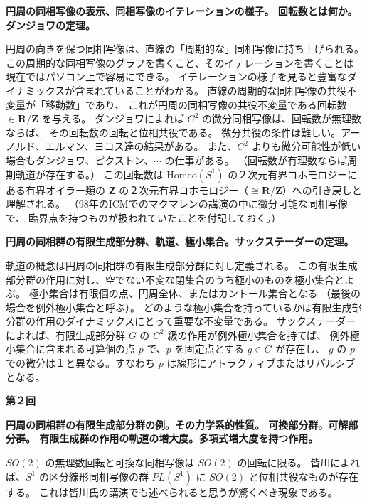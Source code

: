\documentclass[uplatex,dvipdfmx]{jlreq}
\begin{document}
\medskip
\noindent
\textbf{円周の同相写像の表示、同相写像のイテレーションの様子。
回転数とは何か。ダンジョワの定理。}

\medskip

円周の向きを保つ同相写像は、直線の「周期的な」同相写像に持ち上げられる。
この周期的な同相写像のグラフを書くこと、そのイテレーションを書くことは
現在ではパソコン上で容易にできる。
イテレーションの様子を見ると豊富なダイナミックスが含まれていることがわかる。
直線の周期的な同相写像の共役不変量が「移動数」であり、
これが円周の同相写像の共役不変量である回転数 $\in \mathbf{R}/\mathbf{Z}$ を与える。
ダンジョワによれば $C^2$ の微分同相写像は、回転数が無理数ならば、
その回転数の回転と位相共役である。
微分共役の条件は難しい。アーノルド、エルマン、ヨコス達の結果がある。
また、$C^2$ よりも微分可能性が低い場合もダンジョワ、ピクストン、$\cdots$ の仕事がある。
（回転数が有理数ならば周期軌道が存在する。）
この回転数は $\mathrm{Homeo}(S^1)$ の２次元有界コホモロジーにある有界オイラー類の
$\mathbf{Z}$ の２次元有界コホモロジー（$\cong \mathbf{R}/\mathbf{Z}$）への引き戻しと理解される。
（98年のICMでのマクマレンの講演の中に微分可能な同相写像で、
臨界点を持つものが扱われていたことを付記しておく。）

\medskip
\noindent
\textbf{円周の同相群の有限生成部分群、軌道、極小集合。サックステーダーの定理。}

\medskip

軌道の概念は円周の同相群の有限生成部分群に対し定義される。
この有限生成部分群の作用に対し、空でない不変な閉集合のうち極小のものを極小集合とよぶ。
極小集合は有限個の点、円周全体、またはカントール集合となる
（最後の場合を例外極小集合と呼ぶ）。
どのような極小集合を持っているかは有限生成部分群の作用のダイナミックスにとって重要な不変量である。
サックステーダーによれば、有限生成部分群 $G$ の $C^2$ 級の作用が例外極小集合を持てば、
例外極小集合に含まれる可算個の点 $p$ で、$p$ を固定点とする $g \in G$ が存在し、
$g$ の $p$ での微分は１と異なる。すなわち $p$ は線形にアトラクティブまたはリパルシブとなる。

\bigskip
\noindent
{\large\textbf{第２回}}

\medskip
\noindent
\textbf{円周の同相群の有限生成部分群の例。その力学系的性質。
可換部分群。可解部分群。
有限生成群の作用の軌道の増大度。多項式増大度を持つ作用。}

\medskip

$SO(2)$ の無理数回転と可換な同相写像は $SO(2)$ の回転に限る。
皆川によれば、$S^1$ の区分線形同相写像の群 $PL(S^1)$ に
$SO(2)$ と位相共役なものが存在する。
これは皆川氏の講演でも述べられると思うが驚くべき現象である。
\end{document}
